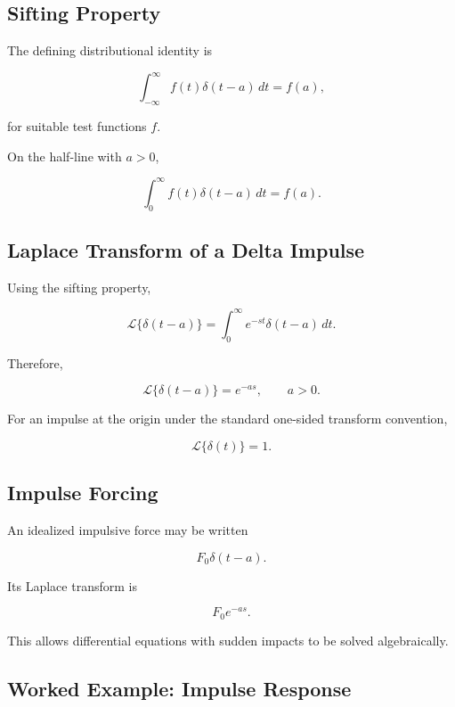 \subsection{Sifting Property}
\label{subsec:delta-sifting}

The defining distributional identity is

\[
\boxed{
\int_{-\infty}^{\infty}
f(t)
\delta(t-a)
\,dt
=
f(a),
}
\]

for suitable test functions \(f\).

On the half-line with \(a>0\),

\[
\boxed{
\int_0^\infty
f(t)
\delta(t-a)
\,dt
=
f(a).
}
\]

\subsection{Laplace Transform of a Delta Impulse}
\label{subsec:laplace-delta}

Using the sifting property,

\[
\mathcal{L}
\{
\delta(t-a)
\}
=
\int_0^\infty
e^{-st}
\delta(t-a)
\,dt.
\]

Therefore,

\[
\boxed{
\mathcal{L}
\{
\delta(t-a)
\}
=
e^{-as},
\qquad
a>0.
}
\]

For an impulse at the origin under the standard one-sided transform
convention,

\[
\boxed{
\mathcal{L}\{\delta(t)\}=1.
}
\]

\subsection{Impulse Forcing}
\label{subsec:impulse-forcing}

An idealized impulsive force may be written

\[
\boxed{
F_0
\delta(t-a).
}
\]

Its Laplace transform is

\[
\boxed{
F_0e^{-as}.
}
\]

This allows differential equations with sudden impacts to be solved
algebraically.

\subsection{Worked Example: Impulse Response}
\label{subsec:worked-impulse-response}

